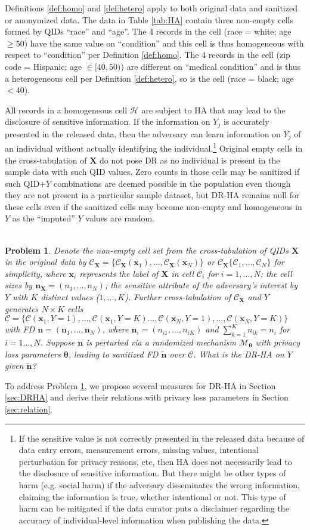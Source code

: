 \documentclass[10pt,journal,compsoc]{IEEEtran}
\newtheorem{problem}{\vspace{-6pt}\\ Problem}
\newcommand{\M}{\mathcal{M}}
\newcommand{\n}{\mathbf{n}}
\newcommand{\X}{\mathbf{X}}
\newcommand{\x}{\mathbf{x}}
\newcommand{\C}{\mathcal{C}}
\newcommand{\bs}{\boldsymbol}
\begin{document}
Definitions \ref{def:homo} and \ref{def:hetero} apply to both original data and sanitized or anonymized data. The data in Table  \ref{tab:HA} contain three non-empty cells formed by QIDs ``race''  and ``age''. The 4 records in the cell (race = white; age $\ge50$) have the same value on ``condition'' and this cell is thus homogeneous with respect to ``condition'' per Definition \ref{def:homo}. The 4 records in the cell (zip code = Hispanic; age $\in[40,50)$) are different on ``medical condition'' and is thus a heterogeneous cell per Definition \ref{def:hetero}, so is the cell (race = black; age $<40$).  

All records in a homogeneous cell $\mathcal{H}$ are subject to HA that  may lead to the disclosure of sensitive information. If the information on $Y_j$ is accurately presented in the released data, then the adversary can learn information on $Y_j$ of an individual without actually identifying the individual.\footnote{If the sensitive value is not correctly presented in the released data because of data entry errors, measurement errors, missing values, intentional perturbation for privacy reasons, etc, then HA  does not necessarily lead to the disclosure of  sensitive information. But there might be other types of harm (e.g. social harm) if the adversary disseminates the wrong information, claiming the information is true, whether intentional or not. This type of harm can be mitigated if the data curator puts a disclaimer regarding the accuracy of individual-level information when publishing the data.} Original empty cells in the cross-tabulation of $\X$ do not pose DR as no individual is present in the sample data with such QID values. Zero counts in those cells may be sanitized if such QID+$Y$ combinations are deemed possible in the population even though they are not present in a particular sample dataset, but DR-HA remains null for these cells even if the sanitized cells may become non-empty and homogeneous in $Y$ as the ``imputed'' $Y$ values are  random.  
\begin{problem}\label{prob} 
Denote the non-empty cell set from the cross-tabulation of QIDs $\X$ in the original data by $\mathscr{C}_{\X}=\{\C_\X(\x_1),\ldots,\C_\X(\x_N)\}$ or $\mathscr{C}_{\X}\{\C_1,\ldots,\C_N\}$ for simplicity, where $\x_i$ represents the label of $\X$ in  cell $\C_i$ for $i=1,\ldots,N$; the cell sizes by $\n_{\X}=(n_1,\ldots, n_N)$; the sensitive attribute of the adversary's interest by $Y$ with $K$ distinct values ($1,\ldots,K$). Further cross-tabulation of $\mathscr{C}_{\X}$ and $Y$  generates $N\times K$ cells $\mathscr{C}=\{\mathcal{C}(\x_1,Y=1),\ldots,\mathcal{C}(\x_1,Y=K)\ldots,\mathcal{C}(\x_N,Y=1),\ldots,\mathcal{C}(\x_N,Y=K)\}$  with FD $\n=(\n_1,\ldots,\n_N)$, where  $\n_i=(n_{i1},\ldots,n_{iK})$ and $\sum_{k=1}^K n_{ik}=n_i$ for $i=1\ldots,N$. Suppose $\n$ is perturbed via a randomized mechanism $\M_{\bs\theta}$ with privacy loss parameters $\bs\theta$, leading to sanitized FD $\tilde{\n}$ over $\mathscr{C}$. What is the DR-HA on  $Y$ given $\tilde{\n}$?
\end{problem}
To address Problem \ref{prob}, we propose several measures for DR-HA in Section \ref{sec:DRHA} and derive their relations with privacy loss parameters in Section \ref{sec:relation}. 
\end{document}
